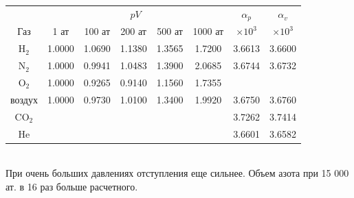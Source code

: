 \begin{tabular}{|c||c|c|c|c|c||c||c|}\hline
        & \multicolumn{5}{|c||}{$pV$}& $\alpha_p$& $\alpha_v$\\ \cline{2-6}
Газ     & 1 ат & 100 ат & 200 ат & 500 ат & 1000 ат & $\times10^3$ & $\times10^3$\\ \hline \hline
H$_2$   & 1.0000 & 1.0690 & 1.1380 & 1.3565 & 1.7200 & 3.6613 & 3.6600 \\ \hline
N$_2$   & 1.0000 & 0.9941 & 1.0483 & 1.3900 & 2.0685 & 3.6744 & 3.6732 \\ \hline
O$_2$   & 1.0000 & 0.9265 & 0.9140 & 1.1560 & 1.7355 &        &        \\ \hline
воздух  & 1.0000 & 0.9730 & 1.0100 & 1.3400 & 1.9920 & 3.6750 & 3.6760 \\ \hline
CO$_2$  &        &        &        &        &        & 3.7262 & 3.7414 \\ \hline
He      &        &        &        &        &        & 3.6601 & 3.6582 \\ \hline
\end{tabular}\\

При очень больших давлениях отступления еще сильнее. Объем азота при 15 000 ат. в 16 раз больше расчетного.

